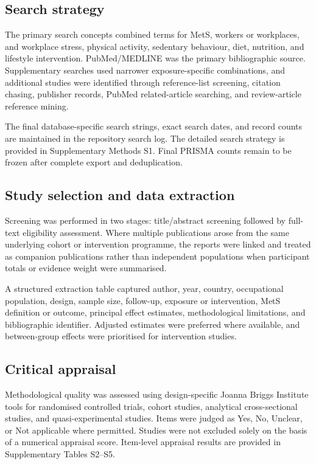 \documentclass[11pt]{article}
\begin{document}
\subsection{Search strategy}

The primary search concepts combined terms for MetS, workers or workplaces, and workplace stress, physical activity, sedentary behaviour, diet, nutrition, and lifestyle intervention. PubMed/MEDLINE was the primary bibliographic source. Supplementary searches used narrower exposure-specific combinations, and additional studies were identified through reference-list screening, citation chasing, publisher records, PubMed related-article searching, and review-article reference mining.

The final database-specific search strings, exact search dates, and record counts are maintained in the repository search log. The detailed search strategy is provided in Supplementary Methods S1. Final PRISMA counts remain to be frozen after complete export and deduplication.

\subsection{Study selection and data extraction}

Screening was performed in two stages: title/abstract screening followed by full-text eligibility assessment. Where multiple publications arose from the same underlying cohort or intervention programme, the reports were linked and treated as companion publications rather than independent populations when participant totals or evidence weight were summarised.

A structured extraction table captured author, year, country, occupational population, design, sample size, follow-up, exposure or intervention, MetS definition or outcome, principal effect estimates, methodological limitations, and bibliographic identifier. Adjusted estimates were preferred where available, and between-group effects were prioritised for intervention studies.

\subsection{Critical appraisal}

Methodological quality was assessed using design-specific Joanna Briggs Institute tools for randomised controlled trials, cohort studies, analytical cross-sectional studies, and quasi-experimental studies. Items were judged as Yes, No, Unclear, or Not applicable where permitted. Studies were not excluded solely on the basis of a numerical appraisal score. Item-level appraisal results are provided in Supplementary Tables S2--S5.
\end{document}
